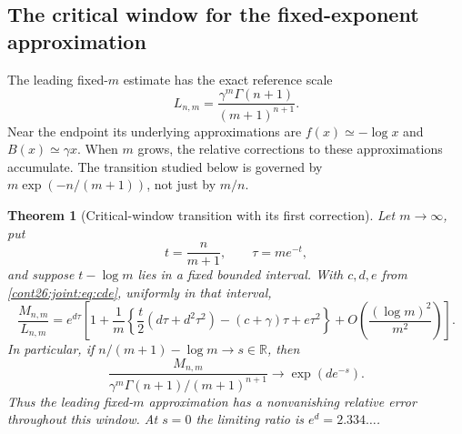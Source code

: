 \documentclass[11pt,letterpaper]{article}
\numberwithin{equation}{section}
\theoremstyle{plain}
\newtheorem{theorem}{Theorem}[section]
\theoremstyle{definition}
\theoremstyle{remark}
\begin{document}
\subsection{The critical window for the fixed-exponent approximation}

The leading fixed-$m$ estimate has the exact reference scale
\begin{equation}\label{cont26:joint:eq:reference}
 L_{n,m}=\frac{\gamma^m\Gamma(n+1)}{(m+1)^{n+1}}.
\end{equation}
Near the endpoint its underlying approximations are
$f(x)\simeq-\log x$ and $B(x)\simeq\gamma x$.
When $m$ grows, the relative corrections to these approximations
accumulate.  The transition studied below is governed by
$m\exp(-n/(m+1))$, not just by $m/n$.

\begin{theorem}[Critical-window transition with its first correction]
\label{cont26:joint:thm:critical}
Let $m\to\infty$, put
\[
 t=\frac n{m+1},\qquad \tau=m e^{-t},
\]
and suppose $t-\log m$ lies in a fixed bounded interval.
With $c,d,e$ from \eqref{cont26:joint:eq:cde}, uniformly in that interval,
\begin{equation}\label{cont26:joint:eq:critical}
 \frac{M_{n,m}}{L_{n,m}}
 =e^{d\tau}\left[
 1+\frac1m\left\{
 \frac t2(d\tau+d^2\tau^2)-(c+\gamma)\tau+e\tau^2
 \right\}
 +O\left(\frac{(\log m)^2}{m^2}\right)\right].
\end{equation}
In particular, if $n/(m+1)-\log m\to s\in\mathbb R$, then
\begin{equation}\label{cont26:joint:eq:critical-limit}
 \frac{M_{n,m}}{\gamma^m\Gamma(n+1)/(m+1)^{n+1}}
 \longrightarrow \exp(d e^{-s}).
\end{equation}
Thus the leading fixed-$m$ approximation has a nonvanishing relative
error throughout this window.  At $s=0$ the limiting ratio is
$e^d=2.334\ldots$.
\end{theorem}
\end{document}
